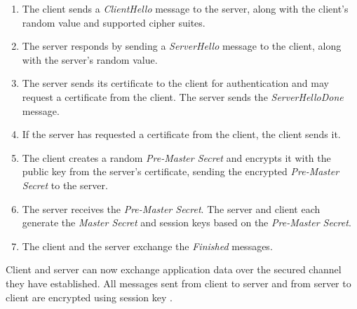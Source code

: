 \documentclass[
  twoside, 12pt, 
  printed, %
  notable,   %
  lof,     %
  lot,     %
]{fithesis3}
\begin{document}
\begin{enumerate}
\item The client sends a \textit{ClientHello} message to the server, along with the client's random value and supported cipher suites.
\item The server responds by sending a \textit{ServerHello} message to the client, along with the server's random value.
\item The server sends its certificate to the client for authentication and may request a certificate from the client. The server sends the \textit{ServerHelloDone} message.
\item If the server has requested a certificate from the client, the client sends it.
\item The client creates a random \textit{Pre-Master Secret} and encrypts it with the public key from the server's certificate, sending the encrypted \textit{Pre-Master Secret} to the server.
\item The server receives the \textit{Pre-Master Secret}. The server and client each generate the \textit{Master Secret} and session keys based on the \textit{Pre-Master Secret}.
\item The client and the server exchange the \textit{Finished} messages.
\end{enumerate}

Client and server can now exchange application data over the secured channel they have established. All messages sent from client to server and from server to client are encrypted using session key \cite{handshakeprotocol}.
\end{document}
